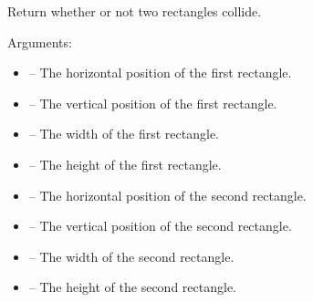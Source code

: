 \documentclass[letterpaper,10pt,english]{sphinxmanual}
\begin{document}
\begin{fulllineitems}
\label{collision:sge.collision.rectangles_collide}
Return whether or not two rectangles collide.

Arguments:
\begin{itemize}
\item {} 
 -- The horizontal position of the first rectangle.

\item {} 
 -- The vertical position of the first rectangle.

\item {} 
 -- The width of the first rectangle.

\item {} 
 -- The height of the first rectangle.

\item {} 
 -- The horizontal position of the second rectangle.

\item {} 
 -- The vertical position of the second rectangle.

\item {} 
 -- The width of the second rectangle.

\item {} 
 -- The height of the second rectangle.

\end{itemize}

\end{fulllineitems}

\end{document}
